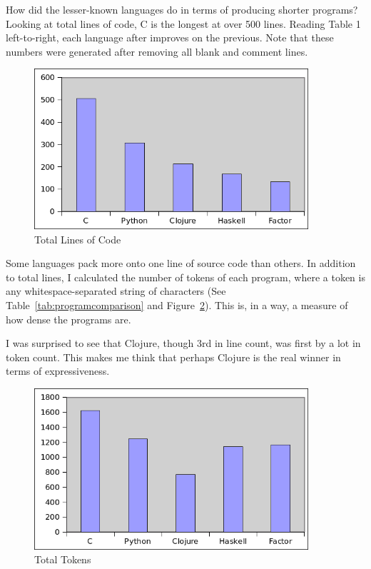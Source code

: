 \documentclass{article}
\begin{document}
How did the lesser-known languages do in terms of producing shorter programs?
Looking at total lines of code, C is the longest at over 500 lines.  Reading
Table 1 left-to-right, each language after improves on the previous.  Note that
these numbers were generated after removing all blank and comment lines.

\begin{figure}[h]
    \centering
    \includegraphics[width=4in]{graphs/total-lines-of-code.png}
    \caption{Total Lines of Code \label{fig:totallines}}
\end{figure}

Some languages pack more onto one line of source code than others.  In addition
to total lines, I calculated the number of tokens of each program, where a token
is any whitespace-separated string of characters (See
Table~\ref{tab:programcomparison} and Figure~\ref{fig:totaltokens}).  This is, in
a way, a measure of how dense the programs are. 

I was surprised to see that Clojure, though 3rd in line count, was first by a
lot in token count.  This makes me think that perhaps Clojure is the real winner
in terms of expressiveness.

\begin{figure}[h]
    \centering
    \includegraphics[width=4in]{graphs/total-tokens.png}
    \caption{Total Tokens \label{fig:totaltokens}}
\end{figure}
\end{document}
